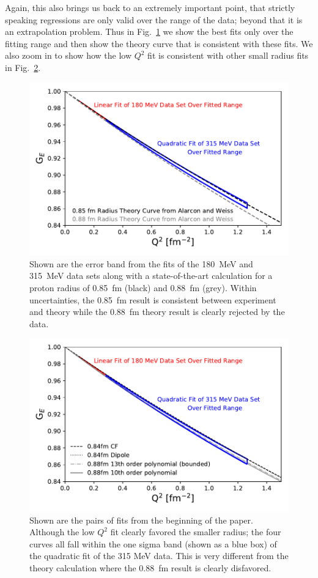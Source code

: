 \documentclass[10pt,aps,prc,twocolumn]{revtex4-1}
\begin{document}
Again, this also brings us back to an extremely important point, that strictly speaking regressions are only 
valid over the range of the data; beyond that it is an extrapolation problem.
Thus in Fig.~\ref{FitsAndTheory} we show the best fits only over the fitting range and then show the theory
curve that is consistent with these fits.   We also zoom in to show how the low $Q^2$ fit is consistent with
other small radius fits in Fig.~\ref{FitsAndOtherFits}.

\begin{figure}[htb]
\includegraphics[width=\columnwidth]{Figure/FitsAndTheory.pdf}
\caption{Shown are the error band from the fits of the 180~MeV and 315~MeV data sets along with a state-of-the-art
calculation for a proton radius of 0.85~fm (black) and 0.88~fm (grey).   Within uncertainties, the 0.85~fm result is
consistent between experiment and theory while the 0.88~fm theory result is clearly rejected by the data.}
\label{FitsAndTheory}
\end{figure}

\begin{figure}[htb]
\includegraphics[width=\columnwidth]{Figure/FitsAndFits.pdf}
\caption{Shown are the pairs of fits from the beginning of the paper.   Although the
low $Q^2$ fit clearly favored the smaller radius; the four curves all fall within the one sigma band (shown as a blue box) 
of the quadratic fit of the 315 MeV data.   This is very different from the theory calculation where the 0.88~fm result
is clearly disfavored.}
\label{FitsAndOtherFits}
\end{figure}
\end{document}
